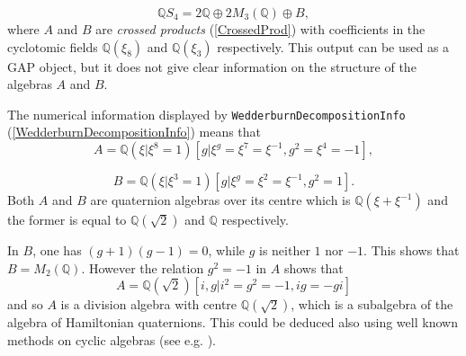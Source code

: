 \documentclass[a4paper,11pt]{report}
\begin{document}
{{\[ {\ensuremath{\mathbb Q}} S_{4} = 2 {\ensuremath{\mathbb Q}} \oplus 2 M_3(
{\ensuremath{\mathbb Q}} ) \oplus B, \]
 where $A$ and $B$ are \emph{crossed products} (\ref{CrossedProd}) with coefficients in the cyclotomic fields ${\ensuremath{\mathbb Q}} (\xi_8)$ and ${\ensuremath{\mathbb Q}} (\xi_3)$ respectively. This output can be used as a \textsf{GAP} object, but it does not give clear information on the structure of the
algebras $A$ and $B$. 

 The numerical information displayed by \texttt{WedderburnDecompositionInfo} (\ref{WedderburnDecompositionInfo}) means that 
\[ A = {\ensuremath{\mathbb Q}} (\xi|\xi^8=1)[g | \xi^g = \xi^7 = \xi^{-1}, g^2 =
\xi^4 = -1], \]
 
\[ B = {\ensuremath{\mathbb Q}} (\xi|\xi^3=1)[g | \xi^g = \xi^2 = \xi^{-1}, g^2 =
1]. \]
 Both $A$ and $B$ are quaternion algebras over its centre which is ${\ensuremath{\mathbb Q}} (\xi+\xi^{-1})$ and the former is equal to ${\ensuremath{\mathbb Q}} (\sqrt{2})$ and ${\ensuremath{\mathbb Q}}$ respectively. 

 In $B$, one has $(g+1)(g-1)=0$, while $g$ is neither $1$ nor $-1$. This shows that $B=M_2( {\ensuremath{\mathbb Q}} )$. However the relation $g^2=-1$ in $A$ shows that 
\[ A={\ensuremath{\mathbb Q}} (\sqrt{2})[i,g|i^2=g^2=-1,ig=-gi] \]
 and so $A$ is a division algebra with centre ${\ensuremath{\mathbb Q}} (\sqrt{2})$, which is a subalgebra of the algebra of Hamiltonian quaternions. This could
be deduced also using well known methods on cyclic algebras (see e.g. \cite{R}). 

}}
\end{document}
